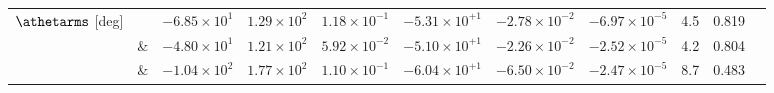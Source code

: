 \begin{table*}
\begin{tabular}{l|l|ccccccccc}
        \hline
        $\athetarms$ [deg] & \DSrefset{} & $-6.85\times10^{1}$ & $1.29\times10^{2}$ & $1.18\times10^{-1}$ & $-5.31\times10^{+1}$ & $-2.78\times10^{-2}$ & $-6.97\times10^{-5}$ & 4.5 & 0.819 \\ 
\rowcolor{lightgray} & \& \DSheatcool{} & $-4.80\times10^{1}$ & $1.21\times10^{2}$ & $5.92\times10^{-2}$ & $-5.10\times10^{+1}$ & $-2.26\times10^{-2}$ & $-2.52\times10^{-5}$ & 4.2 & 0.804 \\ 
        & \& \DScool{} & $-1.04\times10^{2}$ & $1.77\times10^{2}$ & $1.10\times10^{-1}$ & $-6.04\times10^{+1}$ & $-6.50\times10^{-2}$ & $-2.47\times10^{-5}$ & 8.7 & 0.483 \\
        \hline\hline
    \end{tabular}
\end{table*}

